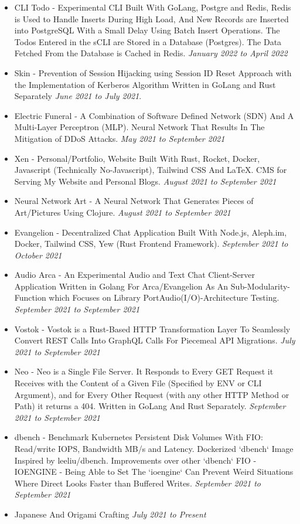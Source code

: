 \documentclass{myresume}
\begin{document}
       \begin{itemize}
       	\item CLI Todo -  Experimental CLI Built With GoLang, Postgre and Redis, Redis is Used to Handle Inserts During High Load, And New Records are Inserted into PostgreSQL With a Small Delay Using Batch Insert Operations. The Todos Entered in the sCLI are Stored in a Database (Postgres). The Data Fetched From the Database is Cached in Redis. \textit{January 2022 to April 2022}
       	\item Skin - Prevention of Session Hijacking using Session ID Reset Approach with the Implementation of Kerberos Algorithm Written in GoLang and Rust Separately \textit{June 2021 to July 2021}.
     	\item Electric Funeral - A Combination of Software Defined Network (SDN) And A Multi-Layer Perceptron (MLP). Neural Network That Results In The Mitigation of DDoS Attacks. \textit{May 2021 to September 2021}
     	\item Xen - Personal/Portfolio, Website Built With Rust, Rocket, Docker, Javascript (Technically No-Javascript), Tailwind CSS And \LaTeX{}. CMS for Serving My Website and Personal Blogs. 
     	\textit{August 2021 to September 2021}
     	\item Neural Network Art -  A Neural Network That Generates Pieces of Art/Pictures Using Clojure. \textit{August 2021 to September 2021}
     	\item Evangelion - Decentralized Chat Application Built With Node.js, Aleph.im, Docker, Tailwind CSS, Yew (Rust Frontend Framework). \textit{September 2021 to October 2021}
     	\item Audio Arca - An Experimental Audio and Text Chat Client-Server Application Written in Golang For Arca/Evangelion As An Sub-Modularity-Function which Focuses on Library PortAudio(I/O)-Architecture Testing. \textit{September 2021 to September 2021}
     	\item Vostok - Vostok is a Rust-Based HTTP Transformation Layer To Seamlessly Convert REST Calls Into GraphQL Calls For Piecemeal API Migrations. \textit {July 2021 to September 2021}
     	\item Neo - Neo is a Single File Server. It Responds to Every GET Request it Receives with the Content of a Given File (Specified by ENV or CLI Argument), and for Every Other Request (with any other HTTP Method or Path) it returns a 404. Written in GoLang And Rust Separately. \textit {September 2021 to September 2021}
     	\item dbench - Benchmark Kubernetes Persistent Disk Volumes With FIO: Read/write IOPS, Bandwidth MB/s and Latency. Dockerized `dbench` Image Inspired by leeliu/dbench. Improvements over other `dbench` FIO - IOENGINE - Being Able to Set The `ioengine` Can Prevent Weird Situations Where Direct Looks Faster than Buffered Writes. \textit{September 2021 to September 2021}    	
       \end{itemize}   
 
        \begin{itemize}
                \item Japanese And Origami Crafting \textit{July 2021 to Present}
        \end{itemize}
\end{document}
